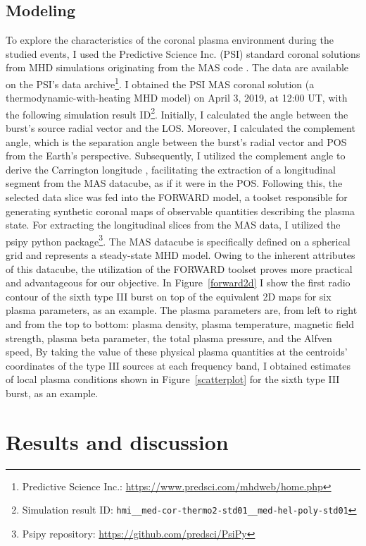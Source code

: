 \subsection{Modeling}
To explore the characteristics of the coronal plasma environment during the studied events, I used the Predictive Science Inc. (PSI) standard coronal solutions from MHD simulations originating from the MAS code \citep{mhd_1999}. The data are available on the PSI's data archive\footnote{Predictive Science Inc.: \url{https://www.predsci.com/mhdweb/home.php}}. I obtained the PSI MAS coronal solution (a thermodynamic-with-heating MHD model) on April 3, 2019, at 12:00 UT, with the following simulation result ID\footnote{Simulation result ID: \texttt{hmi\_\_med-cor-thermo2-std01\_\_med-hel-poly-std01}}.
Initially, I calculated the angle between the burst's source radial vector and the LOS. Moreover, I calculated the complement angle, which is the separation angle between the burst's radial vector and POS from the Earth's perspective.
Subsequently, I utilized the complement angle to derive the Carrington longitude \citep{thompson_2006}, facilitating the extraction of a longitudinal segment from the MAS datacube, as if it were in the POS. Following this, the selected data slice was fed into the FORWARD model, a toolset responsible for generating synthetic coronal maps of observable quantities describing the plasma state.
For extracting the longitudinal slices from the MAS data, I utilized the psipy python package\footnote{Psipy repository: \url{https://github.com/predsci/PsiPy}}.
The MAS datacube is specifically defined on a spherical grid and represents a steady-state MHD model. Owing to the inherent attributes of this datacube, the utilization of the FORWARD toolset proves more practical and advantageous for our objective.
In Figure~\ref{forward2d} I show the first radio contour of the sixth type III burst on top of the equivalent 2D maps for six plasma parameters, as an example. The plasma parameters are, from left to right and from the top to bottom: plasma density, plasma temperature, magnetic field strength, plasma beta parameter, the total plasma pressure, and the Alfven speed, By taking the value of these physical plasma quantities at the centroids' coordinates of the type III sources at each frequency band, I obtained estimates of local plasma conditions shown in Figure~\ref{scatterplot} for the sixth type III burst, as an example.

\section{Results and discussion}
\label{sec_ch3_results}
